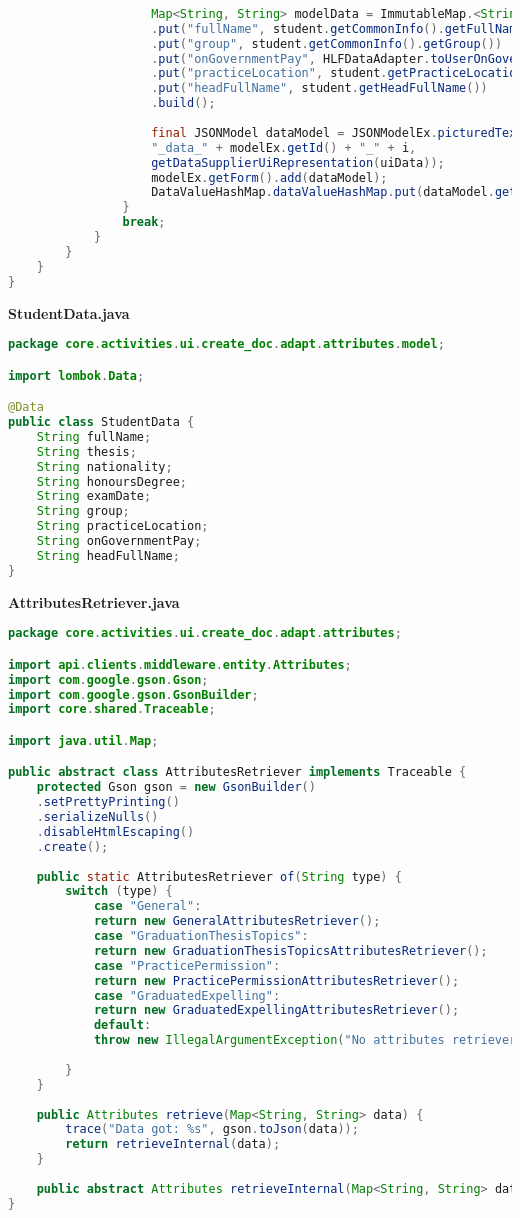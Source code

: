 \begin{lstlisting}[language=Java]
					
					Map<String, String> modelData = ImmutableMap.<String, String>builder()
					.put("fullName", student.getCommonInfo().getFullName())
					.put("group", student.getCommonInfo().getGroup())
					.put("onGovernmentPay", HLFDataAdapter.toUserOnGovernmentPay(student.getCommonInfo().getOnGovernmentPay()))
					.put("practiceLocation", student.getPracticeLocation())
					.put("headFullName", student.getHeadFullName())
					.build();
					
					final JSONModel dataModel = JSONModelEx.picturedTextView(
					"_data_" + modelEx.getId() + "_" + i,
					getDataSupplierUiRepresentation(uiData));
					modelEx.getForm().add(dataModel);
					DataValueHashMap.dataValueHashMap.put(dataModel.getId(), getDataSupplierModelRepresentation(modelData));
				}
				break;
			}
		}
	}
}

\end{lstlisting}
\textbf{StudentData.java}
\begin{lstlisting}[language=Java]
package core.activities.ui.create_doc.adapt.attributes.model;

import lombok.Data;

@Data
public class StudentData {
	String fullName;
	String thesis;
	String nationality;
	String honoursDegree;
	String examDate;
	String group;
	String practiceLocation;
	String onGovernmentPay;
	String headFullName;
}

\end{lstlisting}
\textbf{AttributesRetriever.java}
\begin{lstlisting}[language=Java]
package core.activities.ui.create_doc.adapt.attributes;

import api.clients.middleware.entity.Attributes;
import com.google.gson.Gson;
import com.google.gson.GsonBuilder;
import core.shared.Traceable;

import java.util.Map;

public abstract class AttributesRetriever implements Traceable {
	protected Gson gson = new GsonBuilder()
	.setPrettyPrinting()
	.serializeNulls()
	.disableHtmlEscaping()
	.create();
	
	public static AttributesRetriever of(String type) {
		switch (type) {
			case "General":
			return new GeneralAttributesRetriever();
			case "GraduationThesisTopics":
			return new GraduationThesisTopicsAttributesRetriever();
			case "PracticePermission":
			return new PracticePermissionAttributesRetriever();
			case "GraduatedExpelling":
			return new GraduatedExpellingAttributesRetriever();
			default:
			throw new IllegalArgumentException("No attributes retriever defined for doc with type = " + type);
			
		}
	}
	
	public Attributes retrieve(Map<String, String> data) {
		trace("Data got: %s", gson.toJson(data));
		return retrieveInternal(data);
	}
	
	public abstract Attributes retrieveInternal(Map<String, String> data);
}

\end{lstlisting}
